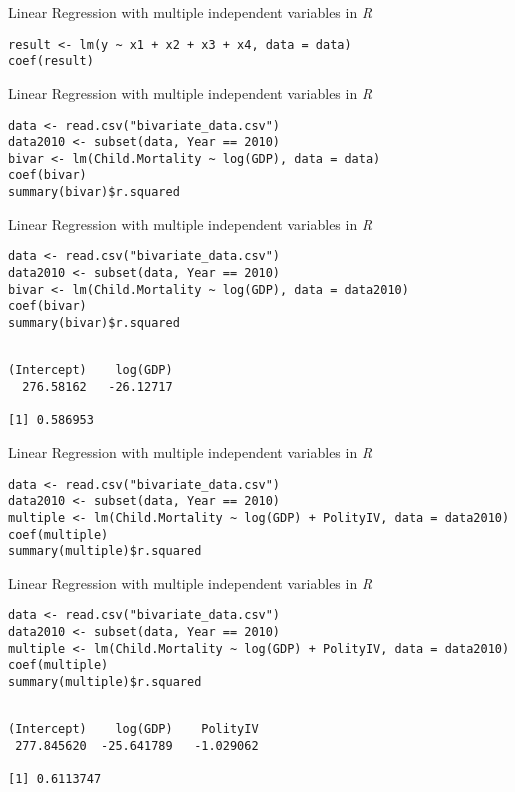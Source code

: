 \documentclass[presentation]{beamer}
\begin{document}
\begin{frame}[fragile,label={sec:orgec9b1d7}]{Linear Regression with multiple independent variables in \emph{R}}
 \begin{verbatim}
result <- lm(y ~ x1 + x2 + x3 + x4, data = data)
coef(result)
\end{verbatim}
\end{frame}



\begin{frame}[fragile,label={sec:org8bde946}]{Linear Regression with multiple independent variables in \emph{R}}
 \begin{verbatim}
data <- read.csv("bivariate_data.csv")
data2010 <- subset(data, Year == 2010)
bivar <- lm(Child.Mortality ~ log(GDP), data = data)
coef(bivar)
summary(bivar)$r.squared
\end{verbatim}
\end{frame}

\begin{frame}[fragile,label={sec:orgc642ab1}]{Linear Regression with multiple independent variables in \emph{R}}
 \begin{verbatim}
data <- read.csv("bivariate_data.csv")
data2010 <- subset(data, Year == 2010)
bivar <- lm(Child.Mortality ~ log(GDP), data = data2010)
coef(bivar)
summary(bivar)$r.squared
\end{verbatim}

\begin{verbatim}

(Intercept)    log(GDP) 
  276.58162   -26.12717

[1] 0.586953
\end{verbatim}
\end{frame}




\begin{frame}[fragile,shrink=20,label={sec:orgf416f8d}]{Linear Regression with multiple independent variables in \emph{R}}
 \begin{verbatim}
data <- read.csv("bivariate_data.csv")
data2010 <- subset(data, Year == 2010)
multiple <- lm(Child.Mortality ~ log(GDP) + PolityIV, data = data2010)
coef(multiple)
summary(multiple)$r.squared
\end{verbatim}
\end{frame}



\begin{frame}[fragile,shrink=20,label={sec:org0c23239}]{Linear Regression with multiple independent variables in \emph{R}}
 \begin{verbatim}
data <- read.csv("bivariate_data.csv")
data2010 <- subset(data, Year == 2010)
multiple <- lm(Child.Mortality ~ log(GDP) + PolityIV, data = data2010)
coef(multiple)
summary(multiple)$r.squared
\end{verbatim}

\begin{verbatim}

(Intercept)    log(GDP)    PolityIV 
 277.845620  -25.641789   -1.029062

[1] 0.6113747
\end{verbatim}
\end{frame}
\end{document}
